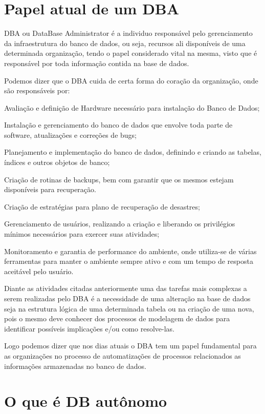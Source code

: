 \section{Papel atual de um DBA}

DBA ou DataBase Administrator é a individuo responsável pelo gerenciamento da infraestrutura do banco de dados, ou seja, recursos ali disponíveis de uma determinada organização, tendo o papel considerado vital na mesma, visto que é responsável por toda informação contida na base de dados.


Podemos dizer que o DBA cuida de certa forma do coração da organização, onde são responsáveis por:
\begin{alineas}
\item Avaliação e definição de Hardware necessário para instalação do Banco de Dados;
\item Instalação e gerenciamento do banco de dados que envolve toda parte de software, atualizações e correções de bugs;
\item Planejamento e implementação do banco de dados, definindo e criando as tabelas, índices e outros objetos de banco;
\item Criação de rotinas de backups, bem com garantir que os mesmos estejam disponíveis para recuperação.
\item Criação de estratégias para plano de recuperação de desastres;
\item Gerenciamento de usuários, realizando a criação e liberando os privilégios mínimos necessários para exercer suas atividades;
\item Monitoramento e garantia de performance do ambiente, onde utiliza-se de várias ferramentas para manter o ambiente sempre ativo e com um tempo de resposta aceitável pelo usuário.
\end{alineas} 


Diante as atividades citadas anteriormente uma das tarefas mais complexas a serem realizadas pelo DBA é a necessidade de uma alteração na base de dados seja na estrutura lógica de uma determinada tabela ou na criação de uma nova, pois o mesmo deve conhecer dos processos de modelagem de dados para identificar possíveis implicações e/ou como resolve-las.


Logo podemos dizer que nos dias atuais o DBA tem um papel fundamental para as organizações no processo de automatizações de processos relacionados as informações armazenadas no banco de dados.


\section{O que é DB autônomo}


